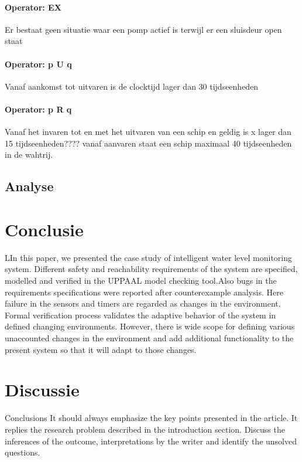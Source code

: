 \documentclass{article}
\begin{document}
	\paragraph{Operator: EX}
	Er bestaat geen situatie waar een pomp actief is terwijl er een sluisdeur open staat
	\paragraph{Operator: p U q}
	Vanaf aankomst tot uitvaren is de clocktijd lager dan 30 tijdseenheden 
	\paragraph{Operator: p R q}
	Vanaf het invaren tot en met het uitvaren van een schip en geldig is x lager dan 15 tijdseenheden????
	vanaf aanvaren staat een schip maximaal 40 tijdseenheden in de wahtrij.
 
\subsection{Analyse}


	\newpage
		\section{Conclusie}
		LIn this paper, we presented the case study of intelligent
		water level monitoring system. Different safety and
		reachability requirements of the system are specified,
		modelled and verified in the UPPAAL model checking
		tool.Also bugs in the requirements specifications were
		reported after counterexample analysis. Here failure in the
		sensors and timers are regarded as changes in the
		environment. Formal verification process validates the
		adaptive behavior of the system in defined changing
		environments. However, there is wide scope for defining
		various unaccounted changes in the environment and add
		additional functionality to the present system so that it
		will adapt to those changes.
		
		
			\newpage
		\section{Discussie}
		Conclusions
		It should always emphasize the key points presented in the article.
		It replies the research problem described in the introduction section. Discuss the inferences of the outcome, interpretations by the writer and identify the unsolved questions. 
		
\end{document}

